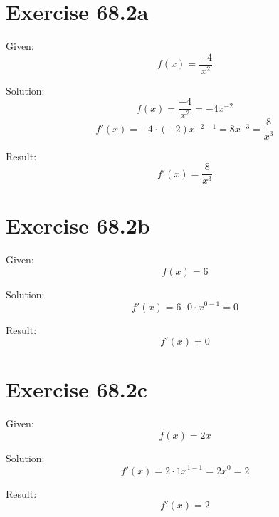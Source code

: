 \documentclass[a4paper, 10pt]{scrartcl}
\begin{document}
\section{Exercise 68.2a}

Given:
\[f(x) = \frac{-4}{x^{2}}\]

Solution:
\[f(x) = \frac{-4}{x^{2}} = -4x^{-2}\]
\[f'(x) = -4\cdot(-2)x^{-2 - 1} = 8x^{-3} = \frac{8}{x^{3}}\]

Result:
\[f'(x) = \frac{8}{x^{3}}\]

\section{Exercise 68.2b}

Given:
\[f(x) = 6\]

Solution:
\[f'(x) = 6\cdot0\cdot x^{0 - 1}= 0\]

Result:
\[f'(x) = 0\]

\section{Exercise 68.2c}

Given:
\[f(x) = 2x\]

Solution:
\[f'(x) = 2\cdot1 x^{1 - 1} = 2x^{0} = 2\]

Result:
\[f'(x) = 2\]
\end{document}
